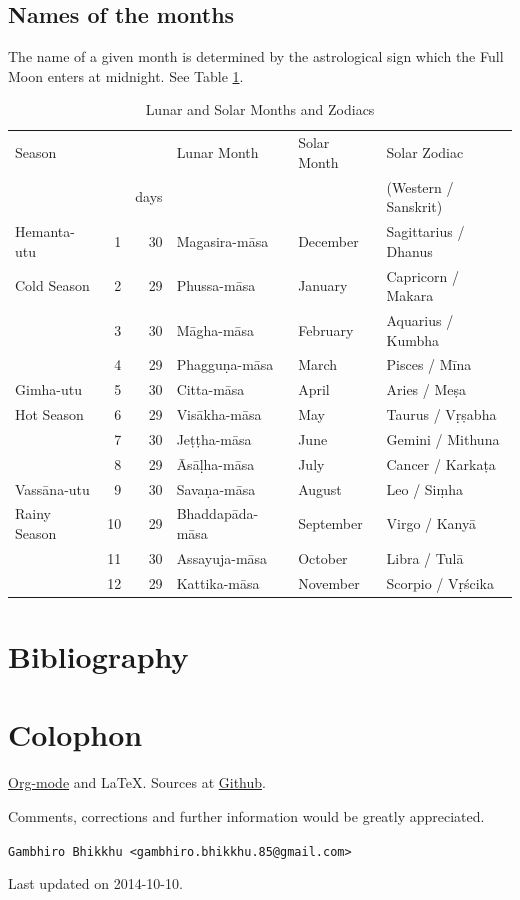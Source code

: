 \documentclass[11pt,oneside]{memoir-article}
\begin{document}
\section{Names of the months}
\label{sec-3-6}

The name of a given month is determined by the astrological sign which
the Full Moon enters at midnight. See Table \ref{tbl-month-names}.

\begin{table}[htb]
\caption{\label{tbl-month-names}Lunar and Solar Months and Zodiacs\cite{hasapannyo-zodiac}}
\centering
\begin{tabular}{lrrlll}
Season &  &  & Lunar Month & Solar Month & Solar Zodiac\\
 &  & days &  &  & (Western / Sanskrit)\\
\hline
Hemanta-utu & 1 & 30 & Magasira-māsa & December & Sagittarius / Dhanus\\
Cold Season & 2 & 29 & Phussa-māsa & January & Capricorn / Makara\\
 & 3 & 30 & Māgha-māsa & February & Aquarius / Kumbha\\
 & 4 & 29 & Phagguṇa-māsa & March & Pisces / Mīna\\
\hline
Gimha-utu & 5 & 30 & Citta-māsa & April & Aries / Meṣa\\
Hot Season & 6 & 29 & Visākha-māsa & May & Taurus / Vṛṣabha\\
 & 7 & 30 & Jeṭṭha-māsa & June & Gemini / Mithuna\\
 & 8 & 29 & Āsāḷha-māsa & July & Cancer / Karkaṭa\\
\hline
Vassāna-utu & 9 & 30 & Savaṇa-māsa & August & Leo / Siṃha\\
Rainy Season & 10 & 29 & Bhaddapāda-māsa & September & Virgo / Kanyā\\
 & 11 & 30 & Assayuja-māsa & October & Libra / Tulā\\
 & 12 & 29 & Kattika-māsa & November & Scorpio / Vṛścika\\
\end{tabular}
\end{table}

\backmatter

\chapter{Bibliography}
\label{sec-4}
\label{bibliography}



\chapter{Colophon}
\label{sec-5}

\href{http://orgmode.org/}{Org-mode} and \LaTeX. Sources at \href{https://github.com/profound-labs/calculating-the-uposatha-moondays/}{Github}.

Comments, corrections and further information would be greatly
appreciated.

\texttt{Gambhiro Bhikkhu <gambhiro.bhikkhu.85@gmail.com>}

Last updated on 2014-10-10.
\end{document}
